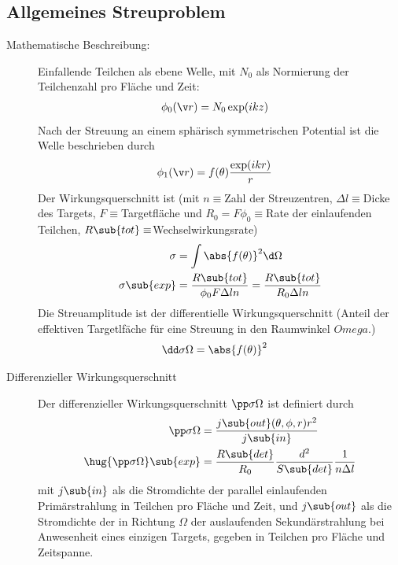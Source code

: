 \documentclass[twocolumn]{summery_4.1}
\begin{document}
\subsection{Allgemeines Streuproblem}
\begin{description}
    \item[Mathematische Beschreibung:]
    Einfallende Teilchen als ebene Welle, mit \(N_0\) als Normierung der Teilchenzahl pro Fläche und Zeit:
    \begin{align*}
        \phi_0(\v r) &= N_0 \exp(ikz) 
    \end{align*} 
    Nach der Streuung an einem sphärisch symmetrischen Potential ist die Welle beschrieben durch 
    \begin{align*}
        \phi_1(\v r) &= f(\theta)\frac{\exp(ikr)}{r}
    \end{align*}
    Der Wirkungsquerschnitt ist (mit \(n\equiv \)Zahl der Streuzentren, \(\Delta l\equiv\)Dicke des Targets, \(F\equiv\)Targetfläche und \(R_0=F\phi_0\equiv\)Rate der einlaufenden Teilchen, \(R\sub{tot}\equiv\)Wechselwirkungsrate)
    \begin{align*}
        \sigma &= \int \abs{f(\theta)}^2\d\Omega\\
        \sigma\sub{exp} &= \frac{R\sub{tot}}{\phi_0 F \Delta l n } = \frac{R\sub{tot}}{R_0 \Delta l n }
    \end{align*}
    Die Streuamplitude ist der differentielle Wirkungsquerschnitt (Anteil der effektiven Targetlfäche für eine Streuung
    in den Raumwinkel \(Omega\).)
    \begin{align*}
        \dd \sigma \Omega &= \abs{f(\theta)}^2
    \end{align*}

    \item[Differenzieller Wirkungsquerschnitt]
    Der differenzieller Wirkungsquerschnitt \(\pp \sigma \Omega\) ist definiert durch
    \begin{align*}
        \pp \sigma \Omega &=\frac{j\sub{out}(\theta,\phi,r) r^2}{j\sub{in}}\\
        \hug{\pp \sigma \Omega}\sub{exp} &= \frac{R\sub{det}}{R_0} \frac{d^2}{S\sub{det}} \frac1{n \Delta l}
    \end{align*} 
    mit \(j\sub{in}\) als die Stromdichte der parallel einlaufenden Primärstrahlung in Teilchen pro Fläche und Zeit, und \(j\sub{out}\) als die Stromdichte der in Richtung \(\Omega\) der auslaufenden Sekundärstrahlung bei Anwesenheit eines einzigen Targets, gegeben in Teilchen pro Fläche und Zeitspanne.


\end{description}
\end{document}

